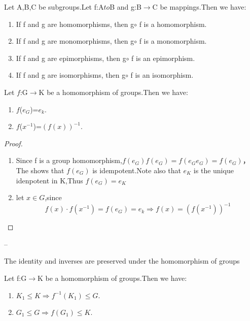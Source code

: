 \documentclass[cn,10pt,math=newtx,citestyle=gb7714-2015,bibstyle=gb7714-2015]{elegantbook}
\begin{document}
\begin{proposition}
    Let A,B,C be subgroups.Let f:A$to$B and g:B$\to$C be mappings.Then we have:
    
\begin{enumerate}
 
\item If f and g are homomorphisms, then g$\circ$ f is a homomorphism.
\item  If f and g are monomorphisms, then g$\circ$ f is a monomorphism.
\item  If f and g are epimorphisms, then g$\circ$ f is an epimorphism.
\item  If f and g are isomorphisms, then g$\circ$ f is an isomorphism.

\end{enumerate}
\end{proposition}
\begin{proposition}
    Let $f$:G$\to$K be a homomorphism of groups.Then we have:
    \begin{enumerate}
        \item $f$($e_G$)=$e_k$.
        \item $f$($x^{-1}$)=$(f(x))^{-1}$.
    \end{enumerate}
\end{proposition}
\begin{proof}
\begin{enumerate}
    \item Since f is a group homomorphism,$f(e_G)f(e_G)=f(e_Ge_G)=f(e_G)$，The shows that $f(e_G)$ is idempotent.Note also that $e_K$ is the unique idenpotent in K,Thus $f(e_G)=e_K$
    \item     let $x\in G$,since
    \begin{equation*}
        f(x)\cdot f(x^{-1})=f(e_G)=e_k\Rightarrow f(x)=(f(x^{-1}))^{-1}
    \end{equation*}
\end{enumerate}
\end{proof}


–\begin{note}
    The identity and inverses are preserved under the homomorphism of groups
\end{note}


\begin{proposition}
    Let f:G$\to$K be a homomorphism of groups.Then we have:
    \begin{enumerate}
        \item $K_1\leq K \Rightarrow f^{-1}(K_1)\leq G.$
        \item $G_1\leq G \Rightarrow f(G_1)\leq K.$
    \end{enumerate}
\end{proposition}
\end{document}
